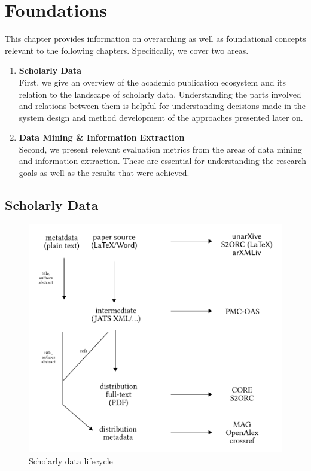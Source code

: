 \chapter{Foundations}

This chapter provides information on overarching as well as foundational concepts relevant to the following chapters. Specifically, we cover two areas.

\begin{enumerate}
    \item \textbf{Scholarly Data}\\
        First, we give an overview of the academic publication ecosystem and its relation to the landscape of scholarly data. Understanding the parts involved and relations between them is helpful for understanding decisions made in the system design and method development of the approaches presented later on.
    \item \textbf{Data Mining \& Information Extraction}\\
        Second, we present relevant evaluation metrics from the areas of data mining and information extraction. These are essential for understanding the research goals as well as the results that were achieved.
\end{enumerate}

\section{Scholarly Data}


\begin{figure}[bt]
  \centering
  \includegraphics[width=0.7\linewidth]{figures/foundations/scholarly_data_lifecycle_dummy}
  \caption[Scholarly data lifecycle]{Scholarly data lifecycle}
  \label{fig:foundations-datalifecycle}
\end{figure}

